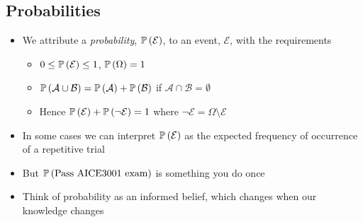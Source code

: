 
\begin{slide}
\section[-2]{Probabilities}

\pb
  \begin{itemize}
  \item We attribute a \emph{probability}, $\mathbb{P}\left( \mathcal{E} \right)$, to an event,
    $\mathcal{E}$, with the requirements\\
    \begin{minipage}{0.6\linewidth}
      \begin{itemize}
      \item $0\leq \mathbb{P}\left( \mathcal{E} \right) \leq 1$, $\mathbb{P}\left( \Omega \right) = 1$\pause
      \item $\mathbb{P}\left( \mathcal{A}\cup\mathcal{B} \right) = \mathbb{P}\left( \mathcal{A} \right) +
        \mathbb{P}\left( \mathcal{B} \right)$ if $\mathcal{A}\cap\mathcal{B}=\emptyset$
      \item Hence $\mathbb{P}\left( \mathcal{E} \right) + \mathbb{P}\left( \neg\mathcal{E} \right) = 1$ where
        $\neg\mathcal{E} = \Omega \setminus \mathcal{E}$
        \pause
      \end{itemize}
    \end{minipage}\hfill
    \begin{minipage}{0.3\linewidth}
      \pause
    \end{minipage}
  \item In some cases we can interpret $\mathbb{P}\left( \mathcal{E} \right)$ as the
    expected frequency of occurrence of a repetitive trial\pauseh
  \item But $\mathbb{P}\left( \text{Pass AICE3001 exam} \right)$ is something you do
    once\pauseh
  \item Think of probability as an informed belief, which changes when
    our knowledge changes\pauseh
  \end{itemize}

\end{slide}


